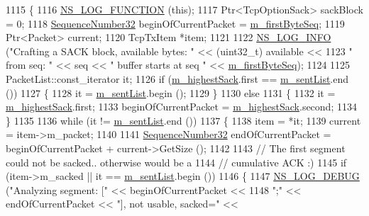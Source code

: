 \begin{DoxyCode}
1115 \{
1116   \hyperlink{log-macros-disabled_8h_a90b90d5bad1f39cb1b64923ea94c0761}{NS\_LOG\_FUNCTION} (\textcolor{keyword}{this});
1117   Ptr<TcpOptionSack> sackBlock = 0;
1118   \hyperlink{group__network_gacb2070e4e98d2d5135c9bede58f07a03}{SequenceNumber32} beginOfCurrentPacket = \hyperlink{classns3_1_1TcpTxBuffer_a46b67e5cb3396b43a41dd3fd5b135346}{m\_firstByteSeq};
1119   Ptr<Packet> current;
1120   TcpTxItem *item;
1121 
1122   \hyperlink{group__logging_gafbd73ee2cf9f26b319f49086d8e860fb}{NS\_LOG\_INFO} (\textcolor{stringliteral}{"Crafting a SACK block, available bytes: "} << (uint32\_t) available <<
1123                \textcolor{stringliteral}{" from seq: "} << seq << \textcolor{stringliteral}{" buffer starts at seq "} << 
      \hyperlink{classns3_1_1TcpTxBuffer_a46b67e5cb3396b43a41dd3fd5b135346}{m\_firstByteSeq});
1124 
1125   PacketList::const\_iterator it;
1126   \textcolor{keywordflow}{if} (\hyperlink{classns3_1_1TcpTxBuffer_a224ded405afbf30d8828c8ddd16b29d9}{m\_highestSack}.first == \hyperlink{classns3_1_1TcpTxBuffer_ae131f4743f4537f3606db664874440e5}{m\_sentList}.end ())
1127     \{
1128       it = \hyperlink{classns3_1_1TcpTxBuffer_ae131f4743f4537f3606db664874440e5}{m\_sentList}.begin ();
1129     \}
1130   \textcolor{keywordflow}{else}
1131     \{
1132       it = \hyperlink{classns3_1_1TcpTxBuffer_a224ded405afbf30d8828c8ddd16b29d9}{m\_highestSack}.first;
1133       beginOfCurrentPacket = \hyperlink{classns3_1_1TcpTxBuffer_a224ded405afbf30d8828c8ddd16b29d9}{m\_highestSack}.second;
1134     \}
1135 
1136   \textcolor{keywordflow}{while} (it != \hyperlink{classns3_1_1TcpTxBuffer_ae131f4743f4537f3606db664874440e5}{m\_sentList}.end ())
1137     \{
1138       item = *it;
1139       current = item->m\_packet;
1140 
1141       \hyperlink{group__network_gacb2070e4e98d2d5135c9bede58f07a03}{SequenceNumber32} endOfCurrentPacket = beginOfCurrentPacket + current->GetSize ();
1142 
1143       \textcolor{comment}{// The first segment could not be sacked.. otherwise would be a}
1144       \textcolor{comment}{// cumulative ACK :)}
1145       \textcolor{keywordflow}{if} (item->m\_sacked || it == \hyperlink{classns3_1_1TcpTxBuffer_ae131f4743f4537f3606db664874440e5}{m\_sentList}.begin ())
1146         \{
1147           \hyperlink{group__logging_ga413f1886406d49f59a6a0a89b77b4d0a}{NS\_LOG\_DEBUG} (\textcolor{stringliteral}{"Analyzing segment: ["} << beginOfCurrentPacket <<
1148                         \textcolor{stringliteral}{";"} << endOfCurrentPacket << \textcolor{stringliteral}{"], not usable, sacked="} <<

\end{DoxyCode}
